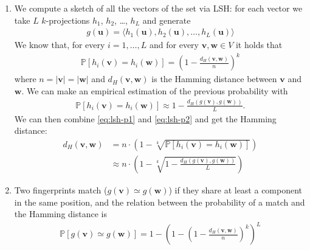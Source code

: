 \begin{enumerate}

  \item We compute a sketch of all the vectors of the set via LSH: for each
  vector we take $L$ $k$-projections $h_1$, $h_2$, \dots, $h_L$ and generate
  \begin{align*}
    g(\textbf{u}) = \langle h_1(\textbf{u}), h_2(\textbf{u}), \dots,
    h_L(\textbf{u}) \rangle
  \end{align*}
  We know that, for every $i = 1, \dots, L$ and for every $\mathbf{v, w} \in V$
  it holds that
  \begin{align}\label{eq:lsh-p1}
    \mathbb{P}[h_i(\textbf{v}) = h_i(\textbf{w})] =
    \left( 1 - \frac{d_H(\textbf{v}, \textbf{w})}{n} \right)^k
  \end{align}
  where $n = |\textbf{v}| = |\textbf{w}|$ and $d_H(\textbf{v}, \textbf{w})$ is
  the Hamming distance between $\textbf{v}$ and $\textbf{w}$. We can make an
  empirical estimation of the previous probability with
  \begin{align}\label{eq:lsh-p2}
    \mathbb{P}[h_i(\textbf{v}) = h_i(\textbf{w})] \approx
    1 - \frac{d_H(g(\textbf{v}), g(\textbf{w}))}{L}.
  \end{align}
  We can then combine \autoref{eq:lsh-p1} and \ref{eq:lsh-p2} and get the
  Hamming distance:
  \begin{align*}
    d_H(\textbf{v}, \textbf{w}) &= n \cdot \left( 1 -
    \sqrt[k]{\mathbb{P}[h_i(\textbf{v}) = h_i(\textbf{w})]}\right) \\
    &\approx n \cdot \left( 1 - \sqrt[k]{1 - \frac{d_H(g(\textbf{v}),
    g(\textbf{w}))}{L}}\right)
  \end{align*}

  \item Two fingerprints match ($g(\textbf{v}) \simeq g(\textbf{w})$) if they
  share at least a component in the same position, and the relation between the
  probability of a match and the Hamming distance is
  \begin{align*}
    \mathbb{P}[g(\textbf{v}) \simeq g(\textbf{w})] = 1 - \left( 1 - \left( 1 -
    \frac{d_H(\textbf{v}, \textbf{w})}{n} \right)^k \right)^L
  \end{align*}


\end{enumerate}
